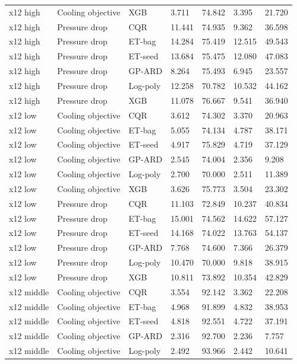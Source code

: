 \begin{longtable}{lllllll}
x12 high & Cooling objective & XGB & 3.711 & 74.842 & 3.395 & 21.720\\
x12 high & Pressure drop & CQR & 11.441 & 74.935 & 9.362 & 36.598\\
x12 high & Pressure drop & ET-bag & 14.284 & 75.419 & 12.515 & 49.543\\
x12 high & Pressure drop & ET-seed & 13.684 & 75.475 & 12.080 & 47.083\\
x12 high & Pressure drop & GP-ARD & 8.264 & 75.493 & 6.945 & 23.557\\
x12 high & Pressure drop & Log-poly & 12.258 & 70.782 & 10.532 & 44.162\\
x12 high & Pressure drop & XGB & 11.078 & 76.667 & 9.541 & 36.940\\
x12 low & Cooling objective & CQR & 3.612 & 74.302 & 3.370 & 20.963\\
x12 low & Cooling objective & ET-bag & 5.055 & 74.134 & 4.787 & 38.171\\
x12 low & Cooling objective & ET-seed & 4.917 & 75.829 & 4.719 & 37.129\\
x12 low & Cooling objective & GP-ARD & 2.545 & 74.004 & 2.356 & 9.208\\
x12 low & Cooling objective & Log-poly & 2.700 & 70.000 & 2.511 & 11.389\\
x12 low & Cooling objective & XGB & 3.626 & 75.773 & 3.504 & 23.302\\
x12 low & Pressure drop & CQR & 11.103 & 72.849 & 10.237 & 40.834\\
x12 low & Pressure drop & ET-bag & 15.001 & 74.562 & 14.622 & 57.127\\
x12 low & Pressure drop & ET-seed & 14.168 & 74.022 & 13.763 & 54.137\\
x12 low & Pressure drop & GP-ARD & 7.768 & 74.600 & 7.366 & 26.379\\
x12 low & Pressure drop & Log-poly & 10.470 & 70.000 & 9.818 & 38.915\\
x12 low & Pressure drop & XGB & 10.811 & 73.892 & 10.354 & 42.829\\
x12 middle & Cooling objective & CQR & 3.554 & 92.142 & 3.362 & 22.208\\
x12 middle & Cooling objective & ET-bag & 4.968 & 91.899 & 4.832 & 38.953\\
x12 middle & Cooling objective & ET-seed & 4.818 & 92.551 & 4.722 & 37.191\\
x12 middle & Cooling objective & GP-ARD & 2.316 & 92.700 & 2.236 & 7.757\\
x12 middle & Cooling objective & Log-poly & 2.492 & 93.966 & 2.442 & 10.641\\

\end{longtable}
